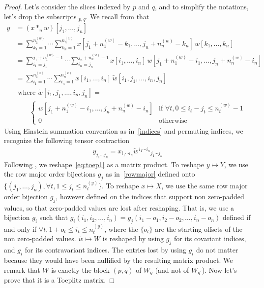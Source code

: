\begin{proof}
Let's consider the slices indexed by $p$ and $q$, and to simplify the notations, let's drop the subscripts $\hspace{0pt}_{p,q}$. We recall from  that
\begin{align*}
  y &= (x \ast_n w)[j_1, \ldots, j_n] \\
 &= \displaystyle \sum_{k_1=1}^{n_1^{(w)}} \cdots \sum_{k_n=1}^{n_n^{(w)}}
    x[j_1 + n_1^{(w)} - k_1, \ldots, j_n + n_n^{(w)} - k_n] \hspace{2pt} w[k_1, \ldots, k_n] \\
 &= \displaystyle \sum_{i_1=j_1}^{j_1 + n_1^{(w)} - 1} \cdots \sum_{i_n=j_n}^{j_n + n_n^{(w)} - 1}
    x[i_1, \ldots, i_n] \hspace{2pt} w[j_1 + n_1^{(w)} - i_1, \ldots, j_n + n_n^{(w)} - i_n] \\
 &= \displaystyle \sum_{i_1=1}^{n_1^{(x)}} \cdots \sum_{i_n=1}^{n_n^{(x)}}
    x[i_1, \ldots, i_n] \hspace{2pt} \widetilde{w}[i_1, j_1, \ldots, i_n, j_n] \\
 & \text{ where } \widetilde{w}[i_1, j_1, \ldots, i_n, j_n] = \\
 & \quad \quad
 \begin{cases}
   w[j_1 + n_1^{(w)} - i_1, \ldots, j_n + n_n^{(w)} - i_n] & \text{if } \forall t, 0 \le i_t - j_t \le n_t^{(w)} - 1 \\
   0 & \text{otherwise}
 \end{cases}
\end{align*}
Using Einstein summation convention as in~\eqref{indices} and permuting indices, we recognize the following tensor contraction
\begin{align}
y_{j_1 \cdots j_n} = x_{i_1 \cdots i_n} \widetilde{w} \hspace{1pt}^{i_1 \cdots i_n} \hspace{0pt}_{j_1 \cdots j_n} \label{eq:toep1}
\end{align}
Following , we reshape~\eqref{eq:toep1} as a matrix product. To reshape $y \mapsto Y$, we use the row major order bijections $g_j$ as in~\eqref{rowmajor} defined onto $\{(j_1, \ldots, j_n), \forall t, 1 \le j_t \le n_t^{(y)}\}$. To reshape $x \mapsto X$, we use the same row major order bijection $g_j$, however defined on the indices that support non zero-padded values, so that zero-padded values are lost after reshaping. That is, we use a bijection $g_i$ such that $g_i(i_1, i_2, \ldots, i_n) = g_j(i_1 - o_1, i_2 - o_2, \ldots, i_n - o_n)$ defined if and only if $\forall t, 1 + o_t \le i_t \le n_t^{(y)}$, where the $\{o_t\}$ are the starting offsets of the non zero-padded values. $\widetilde{w} \mapsto W$ is reshaped by using $g_j$ for its covariant indices, and $g_i$ for its contravariant indices. The entries lost by using $g_i$ do not matter because they would have been nullified by the resulting matrix product. We remark that $W$ is exactly the block $(p,q)$ of $W_g$ (and not of $W_{g'}$). Now let's prove that it is a Toeplitz matrix.


\end{proof}

